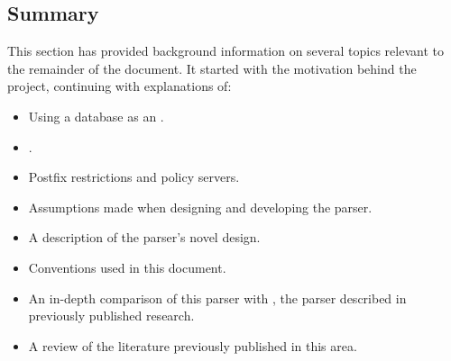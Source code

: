 %

\subsection{Summary}

This section has provided background information on several topics relevant
to the remainder of the document.  It started with the motivation behind
the project, continuing with explanations of:

\begin{itemize}

    \item Using a database as an \API{}.

    \item \SMTP{}.

    \item Postfix restrictions and policy servers.

    \item Assumptions made when designing and developing the parser.

    \item A description of the parser's novel design.

    \item Conventions used in this document.

    \item An in-depth comparison of this parser with \LMA{}, the parser
        described in previously published research.

    \item A review of the literature previously published in this area.

\end{itemize}

